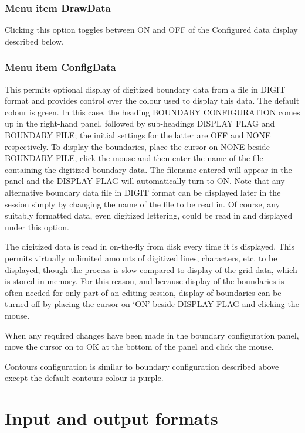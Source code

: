 \documentclass{article}
\begin{document}
\subsubsection[Menu item DrawData]{Menu item DrawData}
Clicking this option toggles between ON and OFF of the Configured data display described below.

\subsubsection[Menu item ConfigData]{Menu item ConfigData}
This permits optional display of digitized boundary data from a file in DIGIT format and provides control over the colour used to display this data. The default colour is green. In this case, the heading BOUNDARY CONFIGURATION comes up in the right-hand panel, followed by sub-headings DISPLAY FLAG and BOUNDARY FILE; the initial settings for the latter are OFF and NONE respectively. To display the boundaries, place the cursor on NONE beside BOUNDARY FILE, click the mouse and then enter the name of the file containing the digitized boundary data. The filename entered will appear in the panel and the DISPLAY FLAG will automatically turn to ON. Note that any alternative boundary data file in DIGIT format can be displayed later in the session simply by changing the name of the file to be read in. Of course, any suitably formatted data, even digitized lettering, could be read in and displayed under this option.

The digitized data is read in {\textquotedbl}on-the-fly{\textquotedbl} from disk every time it is displayed. This permits virtually unlimited amounts of digitized lines, characters, etc. to be displayed, though the process is slow compared to display of the grid data, which is stored in memory. For this reason, and because display of the boundaries is often needed for only part of an editing session, display of boundaries can be turned off by placing the cursor on `ON' beside DISPLAY FLAG and clicking the mouse.

When any required changes have been made in the boundary configuration panel, move the cursor on to OK at the bottom of the panel and click the mouse.

Contours configuration is similar to boundary configuration described above except the default contours colour is purple.



\section{Input and output formats} \label{sec:formats}
\end{document}
